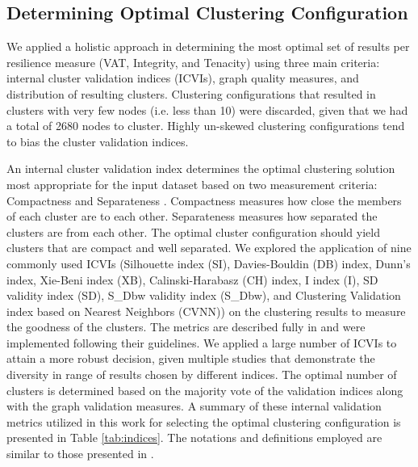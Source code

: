 \documentclass{bmcart}
\begin{document}
\subsection*{Determining Optimal Clustering Configuration}

We applied a holistic approach in determining the most optimal set of results per resilience measure (VAT, Integrity, and Tenacity) using three main criteria: internal cluster validation indices (ICVIs), graph quality measures, and distribution of resulting clusters.
Clustering configurations that resulted in clusters with very few nodes (i.e. less than 10) were discarded, given that we had a total of 2680 nodes to cluster. Highly un-skewed clustering configurations tend to bias the cluster validation indices.

An internal cluster validation index determines the optimal clustering solution most appropriate for the input dataset based on two measurement criteria: Compactness and Separateness \cite{kovacs2005cluster}. Compactness measures how close the members of each cluster are to each other. Separateness measures how separated the clusters are from each other. The optimal cluster configuration should yield clusters that are compact and well separated. We explored the application of nine commonly used ICVIs \cite{liu2010understanding,liu2013understanding,aggarwal2013data} (Silhouette index (SI), Davies-Bouldin (DB) index, Dunn's index, Xie-Beni index (XB), Calinski-Harabasz (CH) index, I index (I),  SD validity index (SD), S\_Dbw validity index (S\_Dbw), and Clustering Validation index based on Nearest Neighbors (CVNN)) on the clustering results to measure the goodness of the clusters. The metrics are described fully in \cite{liu2010understanding, liu2013understanding} and were implemented following their guidelines. 
We applied a large number of ICVIs to attain a more robust decision, given multiple studies \cite{brun2007model,vendramin2010relative,arbelaitz2013extensive,liu2013understanding} that demonstrate the diversity in range of results chosen by different indices.
The optimal number of clusters is determined based on the majority vote of the validation indices along with the graph validation measures. A summary of these internal validation metrics utilized in this work for selecting the optimal clustering configuration is presented in Table \ref{tab:indices}. The notations and definitions employed are similar to those presented in \cite{liu2013understanding}.
\end{document}
